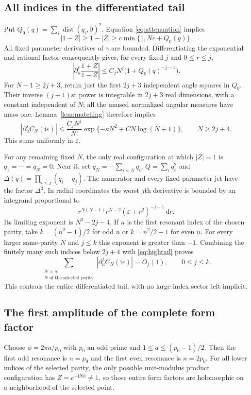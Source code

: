 \documentclass[11pt]{article}
\numberwithin{equation}{section}
\theoremstyle{definition}
\newcommand{\dd}{\,\mathrm d}
\newcommand{\ii}{\mathrm i}
\newcommand{\eps}{\varepsilon}
\newcommand{\dist}{\operatorname{dist}}
\begin{document}
\subsection{All indices in the differentiated tail}
Put $Q_0(q)=\sum_i\dist(q_i,0)^2$. Equation
\eqref{eq:attenuation} implies
\[
 |1-Z|\ge1-|Z|\ge c\min\{1,N\eps+Q_0(q)\}.
\]
All fixed parameter derivatives of $\gamma$ are bounded. Differentiating
the exponential and rational factor consequently gives, for every fixed
$j$ and $0\le r\le j$,
\begin{equation}\label{eq:globaljet}
 \left|\partial_u^r\frac{1+Z}{1-Z}\right|
 \le C_j N^j\bigl(1+Q_0(q)^{-j-1}\bigr).
\end{equation}
For $N-1\ge2j+3$, retain just the first $2j+3$ independent angle
squares in $Q_0$. Their inverse $(j+1)$st power is integrable in
$2j+3$ real dimensions, with a constant independent of $N$; all the
unused normalized angular measures have mass one. Lemma~\ref{lem:matching}
therefore implies
\begin{equation}\label{eq:hightail}
 |\partial_u^j C_N(\ii\eps)|
 \le \frac{C_jN^j}{N!}
       \exp\{-\kappa N^2+C N\log(N+1)\},\qquad N\ge2j+4.
\end{equation}
This sums uniformly in $\eps$.

For any remaining fixed $N$, the only real configuration at which
$|Z|=1$ is $q_1=\cdots=q_N=0$. Near it, set
$q_N=-\sum_{i<N}q_i$, $Q=\sum_iq_i^2$ and
$\Delta(q)=\prod_{i<j}(q_i-q_j)$. The numerator and every fixed
parameter jet have the factor $\Delta^2$. In radial coordinates the
worst $j$th derivative is bounded by an integrand proportional to
\[
 r^{N(N-1)}r^{N-2}(\eps+r^2)^{-j-1}\dd r.
\]
Its limiting exponent is $N^2-2j-4$. If $n$ is the first resonant
index of the chosen parity, take $k=(n^2-1)/2$ for odd $n$ or
$k=n^2/2-1$ for even $n$. For every larger same-parity $N$ and
$j\le k$ this exponent is greater than $-1$. Combining the finitely
many such indices below $2j+4$ with \eqref{eq:hightail} proves
\begin{equation}\label{eq:alltail}
 \sum_{\substack{N>n\\N\text{ of the selected parity}}}
 |\partial_u^j C_N(\ii\eps)|=O_j(1),\qquad0\le j\le k.
\end{equation}
This controls the entire differentiated tail, with no large-index sector
left implicit.

\subsection{The first amplitude of the complete form factor}
Choose $\phi=2\pi a/p_0$ with $p_0$ an odd prime and
$1\le a\le(p_0-1)/2$. Then the first odd resonance is $n=p_0$ and
the first even resonance is $n=2p_0$. For all lower indices of the
selected parity, the only possible unit-modulus product configuration
has $Z=e^{-\ii N\phi}\ne1$, so those entire form factors are
holomorphic on a neighborhood of the selected point.
\end{document}
